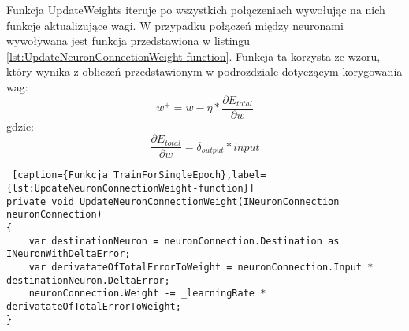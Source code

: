 Funkcja UpdateWeights iteruje po wszystkich połączeniach wywołując na nich funkcje aktualizujące wagi.
W przypadku połączeń między neuronami wywoływana jest funkcja przedstawiona w listingu \ref{lst:UpdateNeuronConnectionWeight-function}.
Funkcja ta korzysta ze wzoru, który wynika z obliczeń przedstawionym w podrozdziale dotyczącym korygowania wag:
\[
w^+=w-\eta*\frac{\partial E_{total}}{\partial w}  
\]
gdzie:
\[
  \frac{\partial E_{total}}{\partial w}  =\delta_{output}*input
\]

\begin{lstlisting} [caption={Funkcja TrainForSingleEpoch},label={lst:UpdateNeuronConnectionWeight-function}]
private void UpdateNeuronConnectionWeight(INeuronConnection neuronConnection)
{
    var destinationNeuron = neuronConnection.Destination as INeuronWithDeltaError;
    var derivatateOfTotalErrorToWeight = neuronConnection.Input * destinationNeuron.DeltaError;
    neuronConnection.Weight -= _learningRate * derivatateOfTotalErrorToWeight;
}
\end{lstlisting}